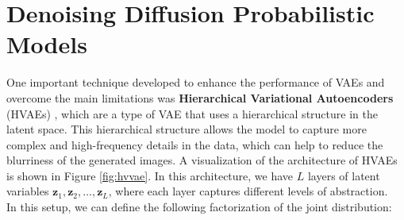 \section{Denoising Diffusion Probabilistic Models}
One important technique developed to enhance the performance of VAEs and overcome the main limitations was \textbf{Hierarchical Variational Autoencoders} (HVAEs) \cite{vahdat2021nvaedeephierarchicalvariational}, which are a type of VAE that uses a hierarchical 
structure in the latent space. This hierarchical structure allows the model to capture more complex and high-frequency details in the data, which can help to reduce the blurriness of the generated images. A visualization of the 
architecture of HVAEs is shown in Figure \ref{fig:hvvae}. In this architecture, we have $L$ layers of latent variables $\mathbf{z}_1, \mathbf{z}_2, \dots, \mathbf{z}_L$, where each layer captures different levels of abstraction. \\
In this setup, we can define the following factorization of the joint distribution: 
